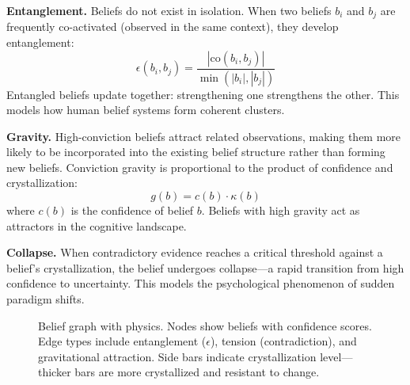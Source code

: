 \documentclass[10pt, twocolumn]{article}
\begin{document}
\textbf{Entanglement.} Beliefs do not exist in isolation. When two beliefs $b_i$ and $b_j$ are frequently co-activated (observed in the same context), they develop entanglement:
\begin{equation}
\epsilon(b_i, b_j) = \frac{|\text{co}(b_i, b_j)|}{\min(|b_i|, |b_j|)}
\end{equation}
Entangled beliefs update together: strengthening one strengthens the other. This models how human belief systems form coherent clusters.

\textbf{Gravity.} High-conviction beliefs attract related observations, making them more likely to be incorporated into the existing belief structure rather than forming new beliefs. Conviction gravity is proportional to the product of confidence and crystallization:
\begin{equation}
g(b) = c(b) \cdot \kappa(b)
\end{equation}
where $c(b)$ is the confidence of belief $b$. Beliefs with high gravity act as attractors in the cognitive landscape.

\textbf{Collapse.} When contradictory evidence reaches a critical threshold against a belief's crystallization, the belief undergoes collapse---a rapid transition from high confidence to uncertainty. This models the psychological phenomenon of sudden paradigm shifts.

\begin{figure}[t]
\centering
{}
\caption{Belief graph with physics. Nodes show beliefs with confidence scores. Edge types include entanglement ($\epsilon$), tension (contradiction), and gravitational attraction. Side bars indicate crystallization level---thicker bars are more crystallized and resistant to change.}
\label{fig:beliefgraph}
\end{figure}
\end{document}
